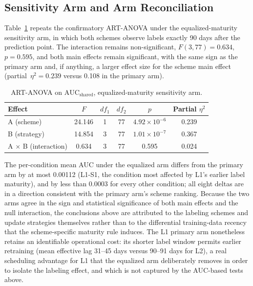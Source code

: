 \subsection{Sensitivity Arm and Arm Reconciliation}

Table~\ref{tab:art-equalized} repeats the confirmatory ART-ANOVA under the equalized-maturity sensitivity arm, in which both schemes observe labels exactly 90 days after the prediction point. The interaction remains non-significant, $F(3,77)=0.634$, $p=0.595$, and both main effects remain significant, with the same sign as the primary arm and, if anything, a larger effect size for the scheme main effect (partial~$\eta^2 = 0.239$ versus 0.108 in the primary arm).

\begin{table}[htbp]
  \centering
  \footnotesize
  \begin{tabular}{l c c c c c}
    \toprule
    Effect & $F$ & $df_1$ & $df_2$ & $p$ & Partial $\eta^2$ \\
    \midrule
    A (scheme) & 24.146 & 1 & 77 & $4.92\times 10^{-6}$ & 0.239 \\
    B (strategy) & 14.854 & 3 & 77 & $1.01\times 10^{-7}$ & 0.367 \\
    A $\times$ B (interaction) & 0.634 & 3 & 77 & 0.595 & 0.024 \\
    \bottomrule
  \end{tabular}
  \caption{ART-ANOVA on $\text{AUC}_{\text{shared}}$, equalized-maturity sensitivity arm.}
  \label{tab:art-equalized}
\end{table}

The per-condition mean AUC under the equalized arm differs from the primary arm by at most 0.00112 (L1-S1, the condition most affected by L1's earlier label maturity), and by less than 0.0003 for every other condition; all eight deltas are in a direction consistent with the primary arm's scheme ranking. Because the two arms agree in the sign and statistical significance of both main effects and the null interaction, the conclusions above are attributed to the labeling schemes and update strategies themselves rather than to the differential training-data recency that the scheme-specific maturity rule induces. The L1 primary arm nonetheless retains an identifiable operational cost: its shorter label window permits earlier retraining (mean effective lag 31--45 days versus 90--91 days for L2), a real scheduling advantage for L1 that the equalized arm deliberately removes in order to isolate the labeling effect, and which is not captured by the AUC-based tests above.

